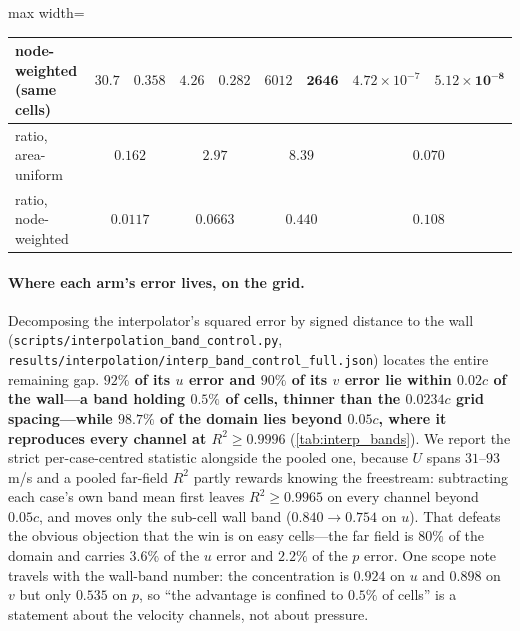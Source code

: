\begin{table}[t]
\begin{adjustbox}{max width=\textwidth}
\begin{tabular}{l r r r r r r r r}
node-weighted (same cells) & $30.7$ & $\mathbf{0.358}$ & $4.26$ & $\mathbf{0.282}$ & $6012$ & $\mathbf{2646}$ & $4.72{\times}10^{-7}$ & $\mathbf{5.12{\times}10^{-8}}$ \\
\midrule
ratio, area-uniform & \multicolumn{2}{c}{$0.162$} & \multicolumn{2}{c}{$\mathbf{2.97}$} & \multicolumn{2}{c}{$\mathbf{8.39}$} & \multicolumn{2}{c}{$0.070$} \\
ratio, node-weighted & \multicolumn{2}{c}{$0.0117$} & \multicolumn{2}{c}{$0.0663$} & \multicolumn{2}{c}{$0.440$} & \multicolumn{2}{c}{$0.108$} \\
\bottomrule
\end{tabular}
\end{adjustbox}
\end{table}

\paragraph{Where each arm's error lives, on the grid.} Decomposing the interpolator's
squared error by signed distance to the wall
(\texttt{scripts\slash{}interpolation\_band\_control.py},
\texttt{results\slash{}interpolation\slash{}interp\_band\_control\_full.json}) locates the entire
remaining gap. \textbf{$92\%$ of its $u$ error and $90\%$ of its $v$ error lie within
$0.02c$ of the wall---a band holding $0.5\%$ of cells, thinner than the $0.0234c$ grid
spacing---while $98.7\%$ of the domain lies beyond $0.05c$, where it reproduces every
channel at $R^2\ge0.9996$} (\autoref{tab:interp_bands}). We report the strict
per-case-centred statistic alongside the pooled one, because $U$ spans $31$--$93$\,m/s and
a pooled far-field $R^2$ partly rewards knowing the freestream: subtracting each case's
own band mean first leaves $R^2\ge0.9965$ on every channel beyond $0.05c$, and moves only
the sub-cell wall band ($0.840\to0.754$ on $u$). That defeats the obvious objection that
the win is on easy cells---the far field is $80\%$ of the domain and carries $3.6\%$ of the
$u$ error and $2.2\%$ of the $p$ error. One scope note travels with the wall-band number:
the concentration is $0.924$ on $u$ and $0.898$ on $v$ but only $0.535$ on $p$, so ``the
advantage is confined to $0.5\%$ of cells'' is a statement about the velocity channels, not
about pressure.

